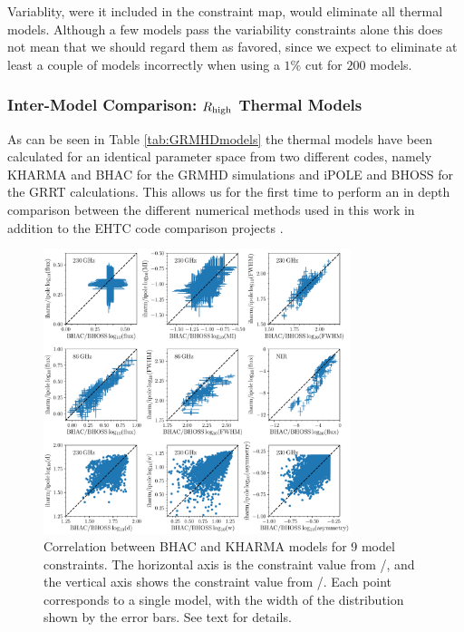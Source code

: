 Variablity, were it included in the constraint map, would eliminate all thermal models.  Although a few models pass the variability constraints alone this does not mean that we should regard them as favored, since we expect to eliminate at least a couple of models incorrectly when using a $1\%$ cut for $200$ models.

\subsubsection{Inter-Model Comparison: $R_\mathrm{high}$ Thermal Models}



As can be seen in Table \ref{tab:GRMHDmodels} the thermal models have been calculated for an identical parameter space from two different codes, namely KHARMA and BHAC for the GRMHD simulations and iPOLE and BHOSS for the GRRT calculations. This allows us for the first time to perform an in depth comparison between the different numerical methods used in this work in addition to the EHTC code comparison projects \citep{2019ApJS..243...26P,2020ApJ...897..148G}.

\begin{figure}
  \centering
  \includegraphics[width=0.8\textwidth]{./figures/BHAC_iharm_correlation}
  \caption{Correlation between BHAC and KHARMA models for 9 model constraints.  The horizontal axis is the constraint value from \bhac/\bhoss, and the vertical axis shows the constraint value from \kharma/\ipole.  Each point corresponds to a single model, with the width of the distribution shown by the error bars.  See text for details.}
  \label{fig:modelcorrelation}
\end{figure}

